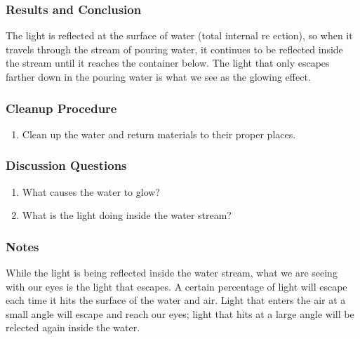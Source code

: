 \subsubsection*{Results and Conclusion}
The light is reflected at the surface of water (total internal re
ection), so when it travels through the stream of pouring water, it continues to be reflected inside the stream until it reaches the container below. The light that only escapes farther down in the pouring water is what we see as the glowing
effect.

\subsubsection*{Cleanup Procedure}
\begin{enumerate}
\item{Clean up the water and return materials to their proper places.}
\end{enumerate}

\subsubsection*{Discussion Questions}
\begin{enumerate}
\item{What causes the water to glow?}
\item{What is the light doing inside the water stream?}
\end{enumerate}

\subsubsection*{Notes}
While the light is being reflected inside the water stream, what we are seeing with our eyes is the light that escapes.  A certain percentage of light will escape each time it hits the surface of the water and air.  Light that enters the air at a small angle will escape and reach our eyes; light that hits at a large angle will be relected again inside the water.
